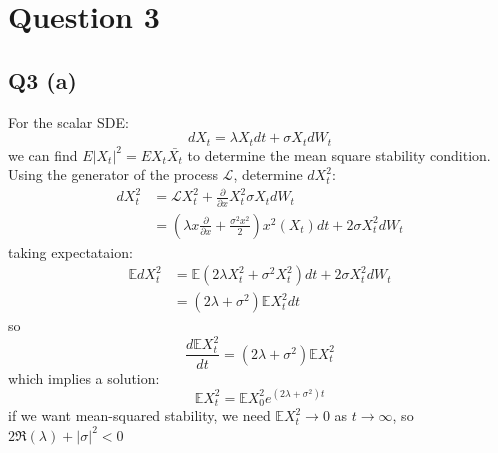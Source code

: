 \documentclass[11pt]{article} %
\begin{document}
\section{Question 3}
\subsection{Q3 (a)}
For the scalar SDE:
\[
	dX_{t} = \lambda X_{t}dt+\sigma X_{t}dW_{t}
\]
we can find $E|X_{t}|^{2} = EX_{t}\bar{X_{t}}$ to determine the mean square stability condition. Using the generator of the process $\mathcal{L}$, determine $dX_{t}^{2}$:
\begin{align}
	dX_{t}^{2} &= \mathcal{L}X_{t}^{2} + \frac{\partial}{\partial x}X_{t}^{2}\sigma X_{t}dW_{t}\\
	&= \left( \lambda x \frac{\partial}{\partial x} + \frac{\sigma^{2}x^{2}}{2} \right)x^{2}(X_{t})dt + 2\sigma X_{t}^{2}dW_{t}
\end{align}
taking expectataion:
\begin{align}
	\mathbb{E}dX_{t}^{2} &= \mathbb{E}(2\lambda X_{t}^{2} + \sigma^{2}X_{t}^{2})dt + 2\sigma X_{t}^{2}dW_{t}\\
	& = (2\lambda + \sigma^{2})\mathbb{E}X_{t}^{2}dt
\end{align}
so
\[
	\frac{d\mathbb{E}X_{t}^{2}}{dt} = (2\lambda + \sigma^{2})\mathbb{E}X_{t}^{2}
\]
which implies a solution:
\[
	\mathbb{E}X_{t}^{2} = \mathbb{E}X_{0}^{2}e^{(2\lambda + \sigma^{2})t}
\]
if we want mean-squared stability, we need $\mathbb{E}X_{t}^{2}\to 0$ as $t\to\infty$, so $2\Re(\lambda) + |\sigma|^{2} < 0$
\end{document}
